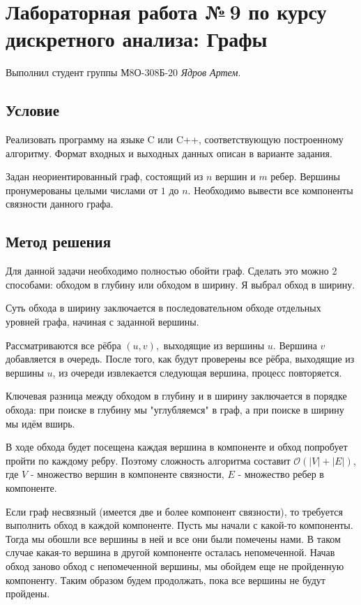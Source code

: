 \documentclass[12pt]{article}
\begin{document}
	
	\section*{Лабораторная работа №\,9 по курсу дискретного анализа: Графы}
	
	Выполнил студент группы М8О-308Б-20 \textit{Ядров Артем}.
	
	\subsection*{Условие}
	
	Реализовать программу на языке C или C++, соответствующую
	построенному алгоритму. Формат входных и выходных данных описан в
	варианте задания.
	
Задан неориентированный граф, состоящий из $n$ вершин и $m$ ребер. Вершины пронумерованы целыми числами от $1$ до $n$.
 Необходимо вывести все компоненты связности данного графа.
	
	\subsection*{Метод решения}
	
	Для данной задачи необходимо полностью обойти граф. Сделать это можно 2 способами: обходом в глубину или обходом в ширину. Я выбрал обход в ширину.
	
	Суть обхода в ширину заключается в последовательном обходе отдельных уровней графа, начиная с заданной вершины.
	
	 Рассматриваются все рёбра $(u, v), $ выходящие из вершины $u$. 
	Вершина $v$ добавляется в очередь.  После того, как будут проверены все рёбра, выходящие из вершины $u$, из очереди извлекается следующая вершина, процесс повторяется.
	
	Ключевая разница между обходом в глубину и в ширину заключается в порядке обхода: при поиске в глубину мы "углубляемся" в граф, а при поиске в ширину мы идём вширь.
	
	В ходе обхода будет посещена каждая вершина в компоненте и обход попробует пройти по каждому ребру. Поэтому сложность алгоритма составит $\mathcal{O}(|V| + |E|)$, где $V$ - множество вершин в компоненте связности, $E$ - множество ребер в компоненте.
	
	Если граф несвязный (имеется две и более компонент связности), то требуется выполнить обход в каждой компоненте. Пусть мы начали с какой-то компоненты. Тогда мы обошли все вершины в ней и все они были помечены нами. В таком случае какая-то вершина в другой компоненте осталась непомеченной. Начав обход заново обход  с непомеченной вершины, мы обойдем еще не пройденную компоненту. Таким образом будем продолжать, пока все вершины не будут пройдены.
	
\end{document}
